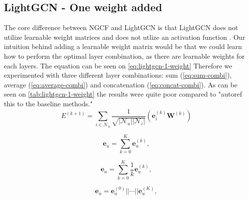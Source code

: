 \subsection{LightGCN - One weight added}
The core difference between NGCF and LightGCN is that LightGCN does not utilize learnable weight matrices and does not utlize an activation function \cite{lightgcn,NGCF_2019}.
Our intuition behind adding a learnable weight matrix would be that we could learn how to perform the optimal layer combination, as there are learnable weights for each layers.
The equation can be seen on \autoref{eq:lightgcn-1-weight}
Therefore we experimented with three different layer combinations: sum (\autoref{eq:sum-combi}), average (\autoref{eq:average-combi}) and concatenation (\autoref{eq:concat-combi}).
As can be seen on \autoref{tab:lightgcn-1-weight} the results were quite poor compared to "autoref this to the baseline methods."
\begin{equation}
    E^{(k+1)} = \sum_{i \in \mathcal{N}_u} \frac{1}{\sqrt{|\mathcal{N}_u||\mathcal{N}_i|}}\left( \mathbf{e}_i^{(k)} \mathbf{W}^{(k)} \right)
    \label{eq:lightgcn-1-weight}
\end{equation}

\begin{equation}
    \mathbf{e}_u = \sum_{k=0}^{K} \mathbf{e}_u^{(k)},
    \label{eq:sum-combi}
\end{equation}

\begin{equation}
    \mathbf{e}_u = \sum_{k=0}^{K} \frac{1}{k} \mathbf{e}_u^{(k)},
    \label{eq:average-combi}
\end{equation}

\begin{equation}
    \mathbf{e}_u = \mathbf{e}_u^{(0)}|| \cdots || \mathbf{e}_u^{(K)},
    \label{eq:concat-combi}
\end{equation}

